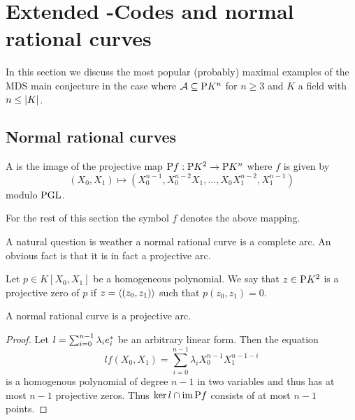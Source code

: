 \section{Extended -Codes and normal rational curves}\label{sec-reedsolomon}

In this section we discuss the most popular (probably) maximal examples of the MDS main conjecture in the case where $\cA\setleq \P K^n$ for $n\geq 3$ and $K$ a field with $n\leq\left\vert{K}\right\vert$.

\subsection{Normal rational curves}

\begin{definition}\label{norratcurve}
    A  is the image of the projective map $\mathrm{P}{f}:\mathrm{P}{K^2}\rightarrow\mathrm{P}{K^n}$ where $f$ is given by
    $$
    (X_0,X_1) \mapsto (X_0^{n-1},X_0^{n-2}X_1,\ldots,X_0 X_1^{n-2},X_1^{n-1})
    $$
    modulo $\mathrm{PGL}$.
\end{definition}

\begin{convention}
For the rest of this section the symbol $f$ denotes the above mapping.    
\end{convention}

A natural question is weather a normal rational curve is a complete arc.
An obvious fact is that it is in fact a projective arc.

\begin{definition}
    Let $p\in K[X_0,X_1]$ be a homogeneous polynomial. We say that $z\in\P K^2$ is a projective zero of $p$ if $z=\gen{(z_0,z_1)}$ such that $p(z_0,z_1)=0$. 
\end{definition}

\begin{lemma}\label{norratcurve-arc}
    A normal rational curve is a projective arc.
\end{lemma}

\begin{proof}
    Let $l=\sum_{i=0}^{n-1}{\lambda_i {e}^{\ast}_i}$ be an arbitrary linear form. Then the equation
    $$
    lf(X_0,X_1)=\sum_{i=0}^{n-1}{\lambda_i X_0^{n-1}X_1^{n-1-i}}
    $$
    is a homogenous polynomial of degree $n-1$ in two variables and thus has at most $n-1$ projective zeros. Thus $\ker l\setmeet \im\P f$ consists of at most $n-1$ points.
\end{proof}


